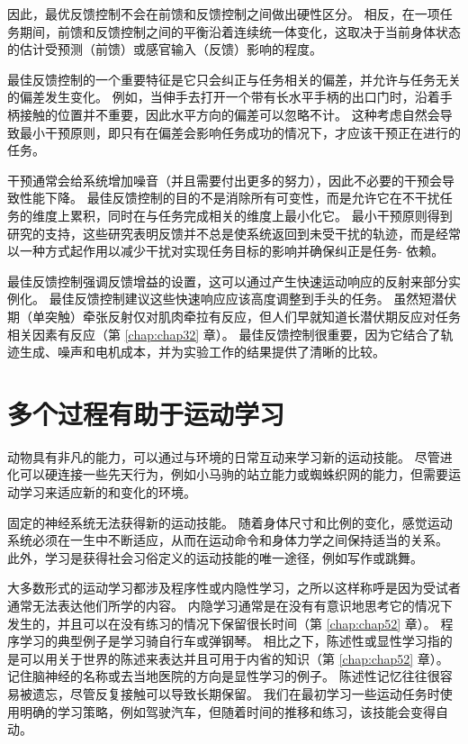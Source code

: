 因此，最优反馈控制不会在前馈和反馈控制之间做出硬性区分。 相反，在一项任务期间，前馈和反馈控制之间的平衡沿着连续统一体变化，这取决于当前身体状态的估计受预测（前馈）或感官输入（反馈）影响的程度。

最佳反馈控制的一个重要特征是它只会纠正与任务相关的偏差，并允许与任务无关的偏差发生变化。 例如，当伸手去打开一个带有长水平手柄的出口门时，沿着手柄接触的位置并不重要，因此水平方向的偏差可以忽略不计。 这种考虑自然会导致最小干预原则，即只有在偏差会影响任务成功的情况下，才应该干预正在进行的任务。

干预通常会给系统增加噪音（并且需要付出更多的努力），因此不必要的干预会导致性能下降。 最佳反馈控制的目的不是消除所有可变性，而是允许它在不干扰任务的维度上累积，同时在与任务完成相关的维度上最小化它。 最小干预原则得到研究的支持，这些研究表明反馈并不总是使系统返回到未受干扰的轨迹，而是经常以一种方式起作用以减少干扰对实现任务目标的影响并确保纠正是任务- 依赖。

最佳反馈控制强调反馈增益的设置，这可以通过产生快速运动响应的反射来部分实例化。 最佳反馈控制建议这些快速响应应该高度调整到手头的任务。 虽然短潜伏期（单突触）牵张反射仅对肌肉牵拉有反应，但人们早就知道长潜伏期反应对任务相关因素有反应（第 \ref{chap:chap32} 章）。 最佳反馈控制很重要，因为它结合了轨迹生成、噪声和电机成本，并为实验工作的结果提供了清晰的比较。



\section{多个过程有助于运动学习}
动物具有非凡的能力，可以通过与环境的日常互动来学习新的运动技能。 尽管进化可以硬连接一些先天行为，例如小马驹的站立能力或蜘蛛织网的能力，但需要运动学习来适应新的和变化的环境。

固定的神经系统无法获得新的运动技能。 随着身体尺寸和比例的变化，感觉运动系统必须在一生中不断适应，从而在运动命令和身体力学之间保持适当的关系。 此外，学习是获得社会习俗定义的运动技能的唯一途径，例如写作或跳舞。

大多数形式的运动学习都涉及程序性或内隐性学习，之所以这样称呼是因为受试者通常无法表达他们所学的内容。 内隐学习通常是在没有有意识地思考它的情况下发生的，并且可以在没有练习的情况下保留很长时间（第 \ref{chap:chap52} 章）。 程序学习的典型例子是学习骑自行车或弹钢琴。 相比之下，陈述性或显性学习指的是可以用关于世界的陈述来表达并且可用于内省的知识（第 \ref{chap:chap52} 章）。 记住脑神经的名称或去当地医院的方向是显性学习的例子。 陈述性记忆往往很容易被遗忘，尽管反复接触可以导致长期保留。 我们在最初学习一些运动任务时使用明确的学习策略，例如驾驶汽车，但随着时间的推移和练习，该技能会变得自动。

